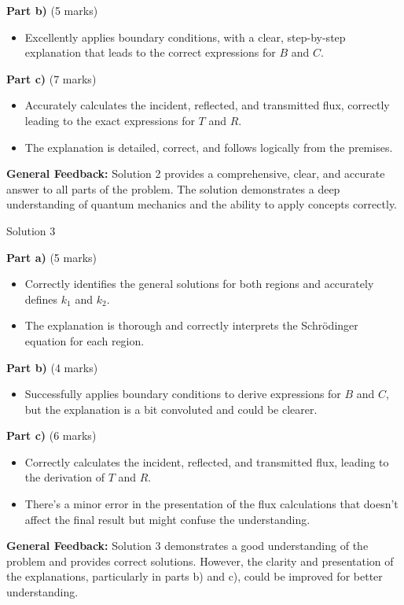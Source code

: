 \documentclass[a4paper,11pt]{article}
\begin{document}
\textbf{Part b)} (5 marks)
\begin{itemize}
    \item Excellently applies boundary conditions, with a clear, step-by-step explanation that leads to the correct expressions for \(B\) and \(C\).
\end{itemize}

\textbf{Part c)} (7 marks)
\begin{itemize}
    \item Accurately calculates the incident, reflected, and transmitted flux, correctly leading to the exact expressions for \(T\) and \(R\).
    \item The explanation is detailed, correct, and follows logically from the premises.
\end{itemize}

\textbf{General Feedback:} Solution 2 provides a comprehensive, clear, and accurate answer to all parts of the problem. The solution demonstrates a deep understanding of quantum mechanics and the ability to apply concepts correctly.

Solution 3

\textbf{Part a)} (5 marks)
\begin{itemize}
    \item Correctly identifies the general solutions for both regions and accurately defines \(k_1\) and \(k_2\).
    \item The explanation is thorough and correctly interprets the Schrödinger equation for each region.
\end{itemize}

\textbf{Part b)} (4 marks)
\begin{itemize}
    \item Successfully applies boundary conditions to derive expressions for \(B\) and \(C\), but the explanation is a bit convoluted and could be clearer.
\end{itemize}

\textbf{Part c)} (6 marks)
\begin{itemize}
    \item Correctly calculates the incident, reflected, and transmitted flux, leading to the derivation of \(T\) and \(R\).
    \item There's a minor error in the presentation of the flux calculations that doesn't affect the final result but might confuse the understanding.
\end{itemize}

\textbf{General Feedback:} Solution 3 demonstrates a good understanding of the problem and provides correct solutions. However, the clarity and presentation of the explanations, particularly in parts b) and c), could be improved for better understanding.
\end{document}
